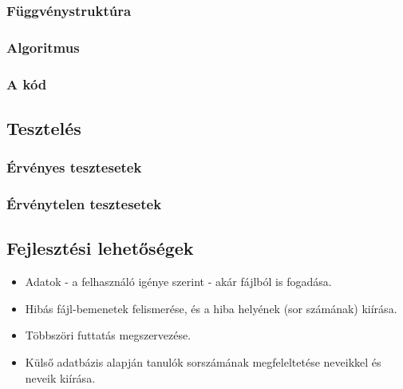 \documentclass[a4paper]{article}
\begin{document}
      \subsubsection{Függvénystruktúra}
      \subsubsection{Algoritmus}
      \subsubsection{A kód}
    \subsection{Tesztelés}
      \subsubsection{Érvényes tesztesetek}
      \subsubsection{Érvénytelen tesztesetek}
    \subsection{Fejlesztési lehetőségek}
      \begin{itemize}
        \item Adatok - a felhasználó igénye szerint - akár fájlból is fogadása.
        \item Hibás fájl-bemenetek felismerése, és a hiba helyének (sor számának) kiírása.
        \item Többszöri futtatás megszervezése.
        \item Külső adatbázis alapján tanulók sorszámának megfeleltetése neveikkel és neveik kiírása.
      \end{itemize}
\end{document}
